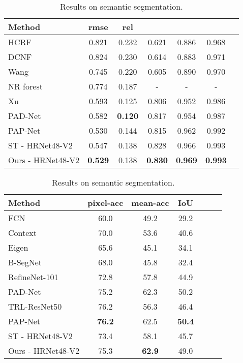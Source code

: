 \documentclass[runningheads]{llncs}
\begin{document}
\begin{table}[t]
    \caption{Comparison with the state-of-the-art on NYUD-v2.}
    \label{tab: nyu_sotat}
\begin{subtable}[t]{0.49\linewidth}
    \centering
    \caption{Results on depth estimation.}
    \label{tab: nyu_depth}
    \tiny{\begin{tabular}{|l|c|c|c|c|c|c|}
\hline
    Method & rmse & rel &  &  &  \\
    \hline
    HCRF \cite{li2015depth} & 0.821 & 0.232 & 0.621 & 0.886 & 0.968 \\
    DCNF \cite{liu2015learning} & 0.824 & 0.230 & 0.614 & 0.883 & 0.971 \\
    Wang \cite{wang2015towards} & 0.745 & 0.220 & 0.605 & 0.890 & 0.970 \\
    NR forest \cite{roy2016monocular} & 0.774 & 0.187 & - & - & - \\
    Xu \cite{xu2018structured} & 0.593 & 0.125 & 0.806 & 0.952 & 0.986 \\
    PAD-Net \cite{xu2018pad} & 0.582 & \textbf{0.120} & 0.817 & 0.954 & 0.987 \\
    PAP-Net \cite{zhang2019pattern} & 0.530 & 0.144 & 0.815 & 0.962 & 0.992 \\
    \hline
    ST - HRNet48-V2 & 0.547 & 0.138 & 0.828 & 0.966 & 0.993 \\
    Ours - HRNet48-V2 & \textbf{0.529} & 0.138 & \textbf{0.830} & \textbf{0.969} & \textbf{0.993} \\
    \hline
    \end{tabular}}
    \end{subtable}\hspace*{\fill}
   \begin{subtable}[t]{0.49\linewidth} \centering
    \caption{Results on semantic segmentation.}
    \label{tab: nyu_sem}
    \tiny{
    \begin{tabular}{|l|c|c|c|c|c|c|}
    \hline
    Method & pixel-acc & mean-acc & IoU \\
    \hline
    FCN \cite{long2015fully} & 60.0 & 49.2 & 29.2 \\
    Context \cite{lin2016efficient} & 70.0 & 53.6 & 40.6 \\
    Eigen \cite{eigen2015predicting} & 65.6 & 45.1 & 34.1 \\
    B-SegNet \cite{kendall2015bayesian} & 68.0 & 45.8 & 32.4 \\
    RefineNet-101 \cite{lin2017refinenet} & 72.8 & 57.8 & 44.9 \\
    PAD-Net \cite{xu2018pad} & 75.2 & 62.3 & 50.2 \\
    TRL-ResNet50 \cite{zhang2018joint} & 76.2 & 56.3 & 46.4 \\
    PAP-Net \cite{zhang2019pattern} & \textbf{76.2} & 62.5 & \textbf{50.4} \\
    \hline
    ST - HRNet48-V2 & 73.4 & 58.1 & 45.7 \\
    Ours - HRNet48-V2 & 75.3 & \textbf{62.9} & 49.0\\
    \hline
    \end{tabular}}
    \end{subtable}

\end{table}
\end{document}
